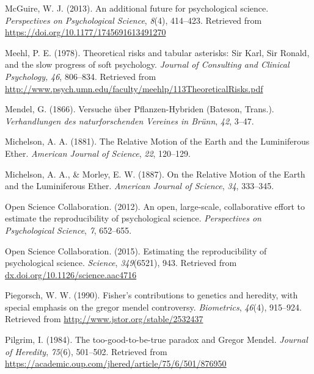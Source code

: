 \documentclass[english,floatsintext,man]{apa6}
\theoremstyle{definition}
\theoremstyle{definition}
\theoremstyle{definition}
\theoremstyle{remark}
\begin{document}
\leavevmode\hypertarget{ref-McGuire:2013}{}%
McGuire, W. J. (2013). An additional future for psychological science.
\emph{Perspectives on Psychological Science}, \emph{8}(4), 414--423.
Retrieved from \url{https://doi.org/10.1177/1745691613491270}

\leavevmode\hypertarget{ref-Meehl:1978}{}%
Meehl, P. E. (1978). Theoretical risks and tabular asterisks: Sir Karl,
Sir Ronald, and the slow progress of soft psychology. \emph{Journal of
Consulting and Clinical Psychology,} \emph{46}, 806--834. Retrieved from
\url{http://www.psych.umn.edu/faculty/meehlp/113TheoreticalRisks.pdf}

\leavevmode\hypertarget{ref-Mendel:1866}{}%
Mendel, G. (1866). Versuche über Pflanzen-Hybriden (Bateson, Trans.).
\emph{Verhandlungen des naturforschenden Vereines in Brünn}, \emph{42},
3--47.

\leavevmode\hypertarget{ref-Michelson:1881}{}%
Michelson, A. A. (1881). The Relative Motion of the Earth and the
Luminiferous Ether. \emph{American Journal of Science}, \emph{22},
120--129.

\leavevmode\hypertarget{ref-Michelson:Morley:1887}{}%
Michelson, A. A., \& Morley, E. W. (1887). On the Relative Motion of the
Earth and the Luminiferous Ether. \emph{American Journal of Science},
\emph{34}, 333--345.

\leavevmode\hypertarget{ref-OpenScienceCollaboration:2012}{}%
Open Science Collaboration. (2012). An open, large-scale, collaborative
effort to estimate the reproducibility of psychological science.
\emph{Perspectives on Psychological Science}, \emph{7}, 652--655.

\leavevmode\hypertarget{ref-OpenScienceCollaboration:2015}{}%
Open Science Collaboration. (2015). Estimating the reproducibility of
psychological science. \emph{Science}, \emph{349}(6521), 943. Retrieved
from
\href{dx.doi.org/10.1126/science.aac4716\%20}{dx.doi.org/10.1126/science.aac4716 }

\leavevmode\hypertarget{ref-Piegorsch:1990}{}%
Piegorsch, W. W. (1990). Fisher's contributions to genetics and
heredity, with special emphasis on the gregor mendel controversy.
\emph{Biometrics}, \emph{46}(4), 915--924. Retrieved from
\url{http://www.jstor.org/stable/2532437}

\leavevmode\hypertarget{ref-Pilgrim:1984}{}%
Pilgrim, I. (1984). The too-good-to-be-true paradox and Gregor Mendel.
\emph{Journal of Heredity}, \emph{75}(6), 501--502. Retrieved from
\url{https://academic.oup.com/jhered/article/75/6/501/876950}
\end{document}

